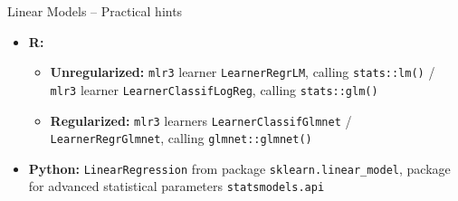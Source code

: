 \begin{frame}{Linear Models -- Practical hints}


\begin{itemize}
  \item \textbf{R:}
  \begin{itemize}
    \item \textbf{Unregularized:} \texttt{mlr3} learner \texttt{LearnerRegrLM}, 
    calling \texttt{stats::lm()} / \texttt{mlr3} learner 
    \texttt{LearnerClassifLogReg}, calling \texttt{stats::glm()}
    \item \textbf{Regularized:} \texttt{mlr3} learners 
    \texttt{LearnerClassifGlmnet} / 
    \texttt{LearnerRegrGlmnet}, calling \texttt{glmnet::glmnet()}
  \end{itemize}
  \item \textbf{Python:} \texttt{LinearRegression} from package 
  \texttt{sklearn.linear\_model}, package for advanced statistical parameters 
  \texttt{statsmodels.api} 
\end{itemize}


\end{frame}